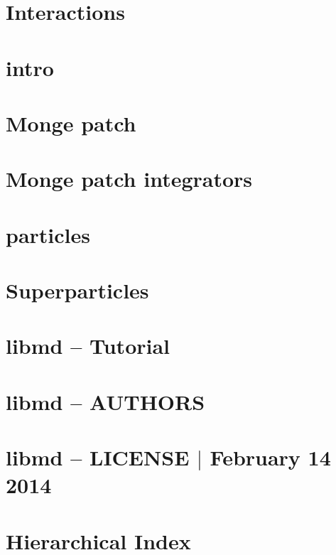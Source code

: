 \let\mypdfximage\pdfximage\def\pdfximage{\immediate\mypdfximage}\documentclass[twoside]{book}
\newcommand{\+}{\discretionary{\mbox{\scriptsize$\hookleftarrow$}}{}{}}
\begin{document}
\chapter{Interactions}
\label{md_doc_markdown_interactions}

\chapter{intro}
\label{md_doc_markdown_intro}

\chapter{Monge patch}
\label{md_doc_markdown_mongepatch}

\chapter{Monge patch integrators}
\label{md_doc_markdown_mp_integrator}

\chapter{particles}
\label{md_doc_markdown_particles}

\chapter{Superparticles}
\label{md_doc_markdown_superparticles}

\chapter{libmd -- Tutorial}
\label{md-tutorial}

\chapter{libmd -- A\+U\+T\+H\+O\+RS}
\label{md-authors}

\chapter{libmd -- L\+I\+C\+E\+N\+SE $\vert$ February 14 2014}
\label{md-license}

\chapter{Hierarchical Index}

\end{document}
